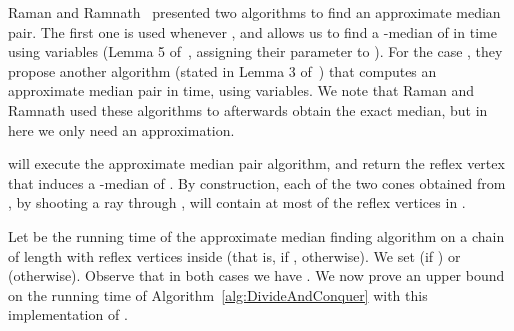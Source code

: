 \documentclass[a4paper]{article}
\begin{document}
Raman and Ramnath~\cite{rr-iubtstsls-98} presented two algorithms to find an approximate median pair. The first one is used whenever , and allows us to find a -median of  in  time using  variables (Lemma 5 of~\cite{rr-iubtstsls-98}, assigning their parameter  to ). For the case , they propose another algorithm (stated in Lemma 3 of~\cite{rr-iubtstsls-98}) that computes an approximate median pair in  time, using  variables. We note that Raman and Ramnath used these algorithms to afterwards obtain the exact median, but in here we only need an approximation. 

 will execute the approximate median pair algorithm, and return the reflex vertex  that induces a -median of . By construction, each of the two cones obtained from , by shooting a ray through , will contain at most  of the reflex vertices in . 

Let  be the running time of the approximate median finding algorithm on a chain  of length  with  reflex vertices inside  (that is,  if ,  otherwise). We set  (if ) or  (otherwise). Observe that in both cases we have . We now prove an upper bound on the running time of Algorithm~\ref{alg:DivideAndConquer} with this implementation of .
\end{document}
